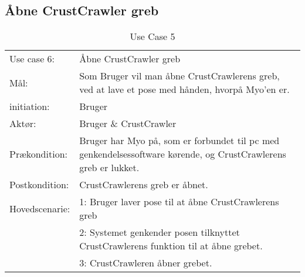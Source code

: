\subsection{Åbne CrustCrawler greb}
\begin{center}
	\begin{table}[htbp]
		\begin{tabular}{lp{274pt}}
			\rowcolor{grey} Use case 6:		& Åbne CrustCrawler greb\\
			Mål: & Som Bruger vil man åbne CrustCrawlerens greb, ved at lave et pose  med hånden, hvorpå Myo'en er.\\
			initiation:	& Bruger \\
			Aktør: & Bruger \& CrustCrawler\\
			Prækondition: & Bruger har Myo på, som er forbundet til pc med genkendelsessoftware kørende, og CrustCrawlerens greb er lukket. \\
			Postkondition: & CrustCrawlerens greb er åbnet. \\
			Hovedscenarie: & 1: Bruger laver pose til at åbne CrustCrawlerens greb\\
			& 2: Systemet genkender posen tilknyttet CrustCrawlerens funktion til at åbne grebet.\\
			& 3: CrustCrawleren åbner grebet.\\
		\end{tabular}
		\caption{Use Case 5}
	\end{table}
\end{center}
\egroup